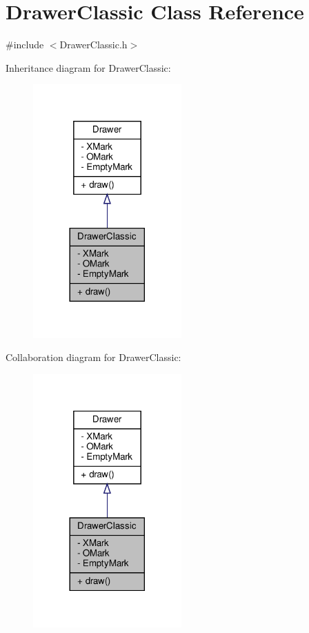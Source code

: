 \hypertarget{classDrawerClassic}{}\section{Drawer\+Classic Class Reference}
\label{classDrawerClassic}


{\ttfamily \#include $<$Drawer\+Classic.\+h$>$}



Inheritance diagram for Drawer\+Classic\+:
\nopagebreak
\begin{figure}[H]
\begin{center}
\leavevmode
\includegraphics[width=161pt]{classDrawerClassic__inherit__graph}
\end{center}
\end{figure}


Collaboration diagram for Drawer\+Classic\+:
\nopagebreak
\begin{figure}[H]
\begin{center}
\leavevmode
\includegraphics[width=161pt]{classDrawerClassic__coll__graph}
\end{center}
\end{figure}
